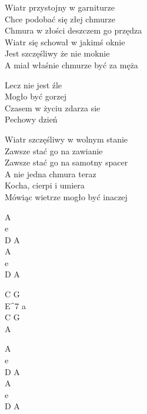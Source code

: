 \begin{text}
    Wiatr przystojny w garniturze\\
    Chce podobać się złej chmurze\\
    Chmura  w złości deszczem go przędza\\
    Wiatr się schował w jakimś oknie\\
    Jest szczęśliwy że nie moknie\\
    A miał właśnie chmurze być za męża

    \vin Lecz nie jest źle\\
    \vin Mogło być gorzej\\
    \vin Czasem w życiu zdarza sie\\
    \vin Pechowy dzień

    Wiatr szczęśliwy w wolnym stanie\\
    Zawsze stać go na zawianie\\
    Zawsze stać go na samotny spacer\\
    A nie jedna chmura teraz\\
    Kocha, cierpi i umiera\\
    Mówiąc wietrze mogło być inaczej
\end{text}
\begin{chord}
    A\\
    e\\
    D A\\
    A\\
    e\\
    D A

    C G\\
    E^7 a\\
    C G\\
    A

    A\\
    e\\
    D A\\
    A\\
    e\\
    D A
\end{chord}